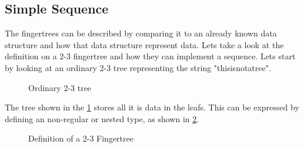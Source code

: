 \subsection{Simple Sequence}
The fingertrees can be described by comparing it to an already
known data structure and how that data structure represent data. Lets take a look
at the definition on a 2-3 fingertree and how they can implement a sequence.
Lets start by looking at an ordinary 2-3 tree representing the string "thisisnotatree".

\begin{figure}[!h]
\centering
{}
\caption{Ordinary 2-3 tree
\label{fig:2-3tree}}
\end{figure}

The tree shown in the \cref{fig:2-3tree} stores all it is data in the leafs.
This can be expressed by defining an non-regular or nested type, as shown in
\cref{fig:2-3Fingertree}.

\begin{figure}[h!]

\caption{Definition of a 2-3 Fingertree \label{fig:2-3Fingertree}}
\end{figure}

